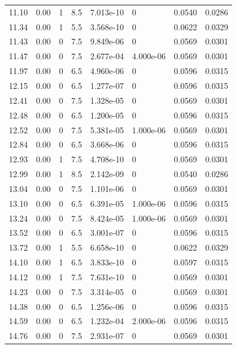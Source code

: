 \documentclass[preview]{standalone}
\begin{document}
{{{\begin{tabular}{L{1.2cm}C{1.2cm} C{0.3cm}C{0.5cm} C{1.4cm}C{1.4cm} C{1.4cm}C{1.4cm}}
  11.10  &  0.00  & 1     & 8.5 &  7.013e-10  & 0  & 0.0540 &  0.0286   \\ 
  11.34  &  0.00  & 1     & 5.5 &  3.568e-10  & 0  & 0.0622 &  0.0329   \\ 
  11.43  &  0.00  & 0     & 7.5 &  9.849e-06  & 0  & 0.0569 &  0.0301   \\ 
  11.47  &  0.00  & 0     & 7.5 &  2.677e-04  & 4.000e-06  & 0.0569 &  0.0301   \\ 
  11.97  &  0.00  & 0     & 6.5 &  4.960e-06  & 0  & 0.0596 &  0.0315   \\ 
  12.15  &  0.00  & 0     & 6.5 &  1.277e-07  & 0  & 0.0596 &  0.0315   \\ 
  12.41  &  0.00  & 0     & 7.5 &  1.328e-05  & 0  & 0.0569 &  0.0301   \\ 
  12.48  &  0.00  & 0     & 6.5 &  1.200e-05  & 0  & 0.0596 &  0.0315   \\ 
  12.52  &  0.00  & 0     & 7.5 &  5.381e-05  & 1.000e-06  & 0.0569 &  0.0301   \\ 
  12.84  &  0.00  & 0     & 6.5 &  3.668e-06  & 0  & 0.0596 &  0.0315   \\ 
  12.93  &  0.00  & 1     & 7.5 &  4.708e-10  & 0  & 0.0569 &  0.0301   \\ 
  12.99  &  0.00  & 1     & 8.5 &  2.142e-09  & 0  & 0.0540 &  0.0286   \\ 
  13.04  &  0.00  & 0     & 7.5 &  1.101e-06  & 0  & 0.0569 &  0.0301   \\ 
  13.10  &  0.00  & 0     & 6.5 &  6.391e-05  & 1.000e-06  & 0.0596 &  0.0315   \\ 
  13.24  &  0.00  & 0     & 7.5 &  8.424e-05  & 1.000e-06  & 0.0569 &  0.0301   \\ 
  13.52  &  0.00  & 0     & 6.5 &  3.001e-07  & 0  & 0.0596 &  0.0315   \\ 
  13.72  &  0.00  & 1     & 5.5 &  6.658e-10  & 0  & 0.0622 &  0.0329   \\ 
  14.10  &  0.00  & 1     & 6.5 &  3.833e-10  & 0  & 0.0597 &  0.0315   \\ 
  14.12  &  0.00  & 1     & 7.5 &  7.631e-10  & 0  & 0.0569 &  0.0301   \\ 
  14.23  &  0.00  & 0     & 7.5 &  3.314e-05  & 0  & 0.0569 &  0.0301   \\ 
  14.38  &  0.00  & 0     & 6.5 &  1.256e-06  & 0  & 0.0596 &  0.0315   \\ 
  14.59  &  0.00  & 0     & 6.5 &  1.232e-04  & 2.000e-06  & 0.0596 &  0.0315   \\ 
  14.76  &  0.00  & 0     & 7.5 &  2.931e-07  & 0  & 0.0569 &  0.0301   \\ 

\end{tabular}}}}
\end{document}
